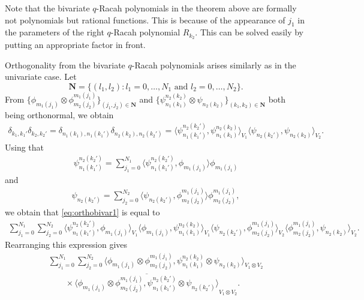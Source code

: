 \documentclass[pdftex]{sigma}
\numberwithin{equation}{section}
\begin{document}
\begin{Remark}
	Note that the bivariate $q$-Racah polynomials in the theorem above are formally not polynomials but rational functions. This is because of the appearance of $j_1$ in the parameters of the right $q$-Racah polynomial $R_{k_2}$. This can be solved easily by putting an appropriate factor in front.
\end{Remark}
\begin{Remark}
	Orthogonality from the bivariate $q$-Racah polynomials arises similarly as in the univariate case. Let
	\[
	\mathbf{N}=\{(l_1,l_2)\colon l_1=0,\dots ,N_1\text{ and }l_2=0,\dots,N_2\}.
	\]
	From $\big\{\phi_{m_1(j_1)}\otimes \phi_{m_2(j_2)}^{m_1(j_1)}\big\}_{(j_1,j_2)\in\mathbf{N}}$ and $\big\{\psi_{n_1(k_1)}^{n_2(k_2)}\otimes \psi_{n_2(k_2)}\big\}_{(k_1,k_2)\in\mathbf{N}}$ both being orthonormal, we obtain
	\begin{gather}
		\delta_{k_1,k_1'}\delta_{k_2,k_2'} =\delta_{n_1(k_1),n_1(k_1')}\delta_{n_2(k_2),n_2(k_2')}= \big\langle \psi_{n_1(k_1')}^{n_2(k_2')},\psi_{n_1(k_1)}^{n_2(k_2)}\big\rangle _{V_1}\big\langle \psi_{n_2(k_2')},\psi_{n_2(k_2)}\big\rangle _{V_2}.\label{eq:orthobivar1}
	\end{gather}
	Using that
	\begin{gather*}
		\psi_{n_1(k_1')}^{n_2(k_2')}=\sum_{j_1=0}^{N_1}\big\langle \psi_{n_1(k_1')}^{n_2(k_2')},\phi_{m_1(j_1)}\big\rangle \phi_{m_1(j_1)}
	\end{gather*}
	and
	\begin{gather*}
		\psi_{n_2(k_2')}=\sum_{j_2=0}^{N_2}\big\langle \psi_{n_2(k_2')},\phi_{m_2(j_2)}^{m_1(j_1)}\big\rangle \phi_{m_2(j_2)}^{m_1(j_1)},
	\end{gather*}
	we obtain that \eqref{eq:orthobivar1} is equal to		
	\begin{gather*}
 \sum_{j_1=0}^{N_1}\sum_{j_2=0}^{N_2} \big\langle \psi_{n_1(k_1')}^{n_2(k_2')},\phi_{m_1(j_1)}\big\rangle _{V_1}\big\langle \phi_{m_1(j_1)},\psi_{n_1(k_1)}^{n_2(k_2)}\big\rangle _{V_1}\big\langle \psi_{n_2(k_2')}, \phi_{m_2(j_2)}^{m_1(j_1)}\big\rangle _{V_2}\big\langle \phi_{m_2(j_2)}^{m_1(j_1)},\psi_{n_2(k_2)}\big\rangle _{V_2}.
\end{gather*}
Rearranging this expression gives
\begin{gather*}
\sum_{j_1=0}^{N_1}\sum_{j_2=0}^{N_2} \big\langle \phi_{m_1(j_1)}\otimes \phi_{m_2(j_2)}^{m_1(j_1)},\psi_{n_1(k_1)}^{n_2(k_2)}\otimes \psi_{n_2(k_2)}\big\rangle _{V_1\otimes V_2}\\
\qquad{} \times \overline{\big\langle \phi_{m_1(j_1)}\otimes \phi_{m_2(j_2)}^{m_1(j_1)},\psi_{n_1(k_1')}^{n_2(k_2')}\otimes \psi_{n_2(k_2')}\big\rangle }_{V_1\otimes V_2}.

\end{gather*}
\end{Remark}
\end{document}

